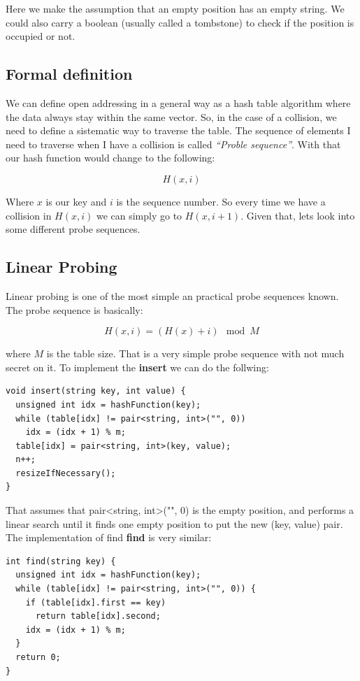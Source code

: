 Here we make the assumption that an empty position has an empty string. We could also carry a boolean (usually called a tombstone) to check if the position is occupied or not. 

\subsection{Formal definition}

We can define open addressing in a general way as a hash table algorithm where the data always stay within the same vector. So, in the case of a collision, we need to define a sistematic way to traverse the table. The sequence of elements I need to traverse when I have a collision is called \textit{``Proble sequence''}. With that our hash function would change to the following:

\[ H(x, i) \]

Where \( x \) is our key and \( i \) is the sequence number. So every time we have a collision in \( H(x, i) \) we can simply go to \( H(x, i + 1) \). Given that, lets look into some different probe sequences.

\subsection{Linear Probing}

Linear probing is one of the most simple an practical probe sequences known. The probe sequence is basically:

\[ H(x, i) = (H(x) + i) \mod M \]

where \( M \) is the table size. That is a very simple probe sequence with not much secret on it. To implement the \textbf{insert} we can do the follwing:

\begin{lstlisting}
void insert(string key, int value) {
  unsigned int idx = hashFunction(key);
  while (table[idx] != pair<string, int>("", 0))
    idx = (idx + 1) % m;      
  table[idx] = pair<string, int>(key, value);
  n++;
  resizeIfNecessary();
}
\end{lstlisting}

That assumes that pair<string, int>("", 0) is the empty position, and performs a linear search until it finds one empty position to put the new (key, value) pair. The implementation of find \textbf{find} is very similar:

\begin{lstlisting}
int find(string key) {
  unsigned int idx = hashFunction(key);
  while (table[idx] != pair<string, int>("", 0)) {
    if (table[idx].first == key) 
      return table[idx].second;
    idx = (idx + 1) % m;
  }
  return 0;
}
\end{lstlisting}

